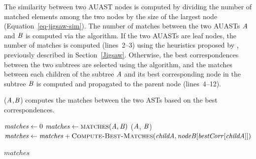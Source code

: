 


The similarity between two AUAST nodes is computed by dividing the number of matched elements among the two nodes by the size of the largest node (Equation~\ref{eq-jigsaw-sim}). The number of matches between the two AUASTs $\mathit{A}$ and $\mathit{B}$ is computed via the  algorithm. If the two AUASTs are leaf nodes, the number of matches is computed (lines~2--3) using the heuristics proposed by \citet{2008:fse:cottrell}, previously described in Section~\ref{Jigsaw}. Otherwise, the best correspondences between the two subtrees are selected using the  algorithm, and the matches between each children of the subtree $\mathit{A}$ and its best corresponding node in the subtree $\mathit{B}$ is computed and propagated to the parent node (lines~4--12).


\begin{algorithm}
 \caption{($\mathit{A}$,$\mathit{B}$) computes the matches between the two ASTs based on the best correspondences.}
  \label{simi}
  \begin{algorithmic}[1]
  \ComputeBestMatches
  \State $\mathit{matches} \gets 0$
  \State $\mathit{matches} \gets   \textsc{matches}(\mathit{A},\mathit{B})$
    	\State {}($\mathit{A}$, $\mathit{B}$)
 		\State $\mathit{matches} \gets \mathit{matches}+\textsc{Compute-Best-Matches}(\mathit{childA},\mathit{nodeB}[\mathit{bestCorr}[\mathit{childA}]])$		 
 \EndIf
 \EndFor

 \EndIf
 \Return $matches$
\end{algorithmic}
\end{algorithm}







